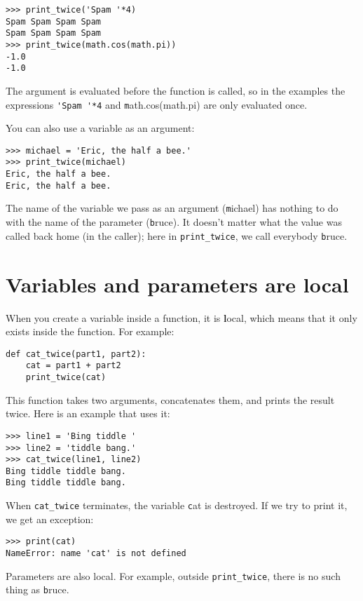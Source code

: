 \documentclass[
DIV=11,
fontsize=12,
twoside,
headinclude=false,
titlepage=firstiscover,
abstract=true,
headsepline=true,
footsepline=true,
chapterprefix=true, %
headings=big,
bibliography=totoc,%
captions=tableheading
]{scrbook}
\theoremstyle{definition}
\begin{document}
\begin{lstlisting}
>>> print_twice('Spam '*4)
Spam Spam Spam Spam
Spam Spam Spam Spam
>>> print_twice(math.cos(math.pi))
-1.0
-1.0
\end{lstlisting}
%
The argument is evaluated before the function is called, so
in the examples the expressions \verb"'Spam '*4" and
{\texttt math.cos(math.pi)} are only evaluated once.

You can also use a variable as an argument:

\begin{lstlisting}
>>> michael = 'Eric, the half a bee.'
>>> print_twice(michael)
Eric, the half a bee.
Eric, the half a bee.
\end{lstlisting}
%
The name of the variable we pass as an argument ({\texttt michael}) has
nothing to do with the name of the parameter ({\texttt bruce}).  It
doesn't matter what the value was called back home (in the caller);
here in \verb"print_twice", we call everybody {\texttt bruce}.


\section{Variables and parameters are local}

When you create a variable inside a function, it is {\textbf local},
which means that it only
exists inside the function.  For example:

\begin{lstlisting}
def cat_twice(part1, part2):
    cat = part1 + part2
    print_twice(cat)
\end{lstlisting}
%
This function takes two arguments, concatenates them, and prints
the result twice.  Here is an example that uses it:

\begin{lstlisting}
>>> line1 = 'Bing tiddle '
>>> line2 = 'tiddle bang.'
>>> cat_twice(line1, line2)
Bing tiddle tiddle bang.
Bing tiddle tiddle bang.
\end{lstlisting}
%
When \verb"cat_twice" terminates, the variable {\texttt cat}
is destroyed.  If we try to print it, we get an exception:

\begin{lstlisting}
>>> print(cat)
NameError: name 'cat' is not defined
\end{lstlisting}
%
Parameters are also local.
For example, outside \verb"print_twice", there is no
such thing as {\texttt bruce}.
\end{document}
